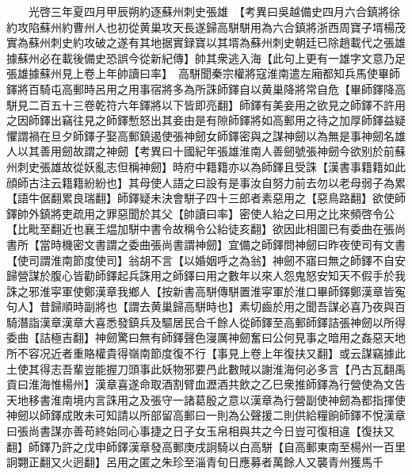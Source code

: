 　　光啓三年夏四月甲辰朔約逐蘇州刺史張雄　【考異曰吳越備史四月六合鎮將徐約攻陷蘇州約曹州人也初從黄巢攻天長遂歸高駢駢用為六合鎮將浙西周寶子壻楊茂實為蘇州刺史約攻破之遂有其地据實録寶以其壻為蘇州刺史朝廷已除趙載代之張雄據蘇州必在載後備史恐誤今從新紀傳】帥其衆逃入海【此句上更有一雄字文意乃足張雄據蘇州見上卷上年帥讀曰率】　高駢聞秦宗權將寇淮南遣左廂都知兵馬使畢師鐸將百騎屯高郵時呂用之用事宿將多為所誅師鐸自以黄巢降將常自危【畢師鐸降高駢見二百五十三卷乾符六年鐸將以下皆即亮翻】師鐸有美妾用之欲見之師鐸不許用之因師鐸出竊往見之師鐸慙怒出其妾由是有隙師鐸將如高郵用之待之加厚師鐸益疑懼謂禍在旦夕師鐸子娶高郵鎮遏使張神劒女師鐸密與之謀神劒以為無是事神劒名雄人以其善用劒故謂之神劒【考異曰十國紀年張雄淮南人善劒號張神劒今欲别於前蘇州刺史張雄故從妖亂志但稱神劒】時府中籍籍亦以為師鐸且受誅【漢書事籍籍如此顔師古注云籍籍紛紛也】其母使人語之曰設有是事汝自努力前去勿以老母弱子為累【語牛倨翻累良瑞翻】師鐸疑未決會駢子四十三郎者素惡用之【惡鳥路翻】欲使師鐸帥外鎮將吏疏用之罪惡聞於其父【帥讀曰率】密使人紿之曰用之比來頻啓令公【比毗至翻近也襄王煴加駢中書令故稱令公紿徒亥翻】欲因此相圖已有委曲在張尚書所【當時機密文書謂之委曲張尚書謂神劒】宜備之師鐸問神劒曰昨夜使司有文書【使司謂淮南節度使司】翁胡不言【以婚姻呼之為翁】神劒不寤曰無之師鐸不自安歸營謀於腹心皆勸師鐸起兵誅用之師鐸曰用之數年以來人怨鬼怒安知天不假手於我誅之邪淮寜軍使鄭漢章我鄉人【按新書高駢傳駢置淮寜軍於淮口畢師鐸鄭漢章皆寃句人】昔歸順時副將也【謂去黄巢歸高駢時也】素切齒於用之聞吾謀必喜乃夜與百騎潛詣漢章漢章大喜悉發鎮兵及驅居民合千餘人從師鐸至高郵師鐸詰張神劒以所得委曲【詰極吉翻】神劒驚曰無有師鐸聲色寖厲神劒奮曰公何見事之暗用之姦惡天地所不容况近者重賂權貴得嶺南節度復不行【事見上卷上年復扶又翻】或云謀竊據此土使其得志吾輩豈能握刀頭事此妖物邪要冎此數賊以謝淮海何必多言【冎古瓦翻禹貢曰淮海惟楊州】漢章喜遂命取酒割臂血瀝酒共飲之乙巳衆推師鐸為行營使為文告天地移書淮南境内言誅用之及張守一諸葛殷之意以漢章為行營副使神劒為都指揮使神劒以師鐸成敗未可知請以所部留高郵曰一則為公聲援二則供給糧餉師鐸不悅漢章曰張尚書謀亦善苟終始同心事捷之日子女玉帛相與共之今日豈可復相違【復扶又翻】師鐸乃許之戊申師鐸漢章發高郵庚戌詗騎以白高駢【自高郵東南至楊州一百里詗翾正翻又火迥翻】呂用之匿之朱珍至淄青旬日應募者萬餘人又襲青州獲馬千


